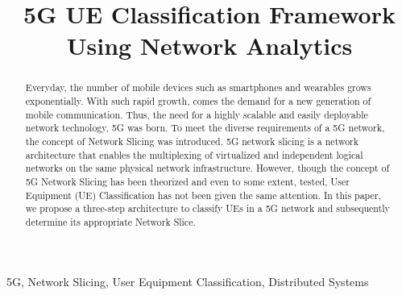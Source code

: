 \documentclass[conference]{IEEEtran}
\begin{document}
\title{5G UE Classification Framework Using Network Analytics\\
{\footnotesize \textsuperscript{}}
}

\author{
\and
{}
\and
{}
\and

}

\maketitle

\begin{abstract}
Everyday, the number of mobile devices such as smartphones and wearables grows exponentially. With such rapid growth, comes the demand for a new generation of mobile communication.
Thus, the need for a highly scalable and easily deployable network technology, 5G was born. To meet the diverse requirements of a 5G network, the concept of Network Slicing was introduced.
5G network slicing is a network architecture that enables the multiplexing of virtualized and independent logical networks on the same physical network infrastructure. However, though the concept of 5G Network Slicing has been theorized and even to some extent, tested, User Equipment (UE) Classification has not been given the same attention. In this paper, we propose a three-step architecture to classify UEs in a 5G network and subsequently determine its appropriate Network Slice.
\end{abstract}

\begin{IEEEkeywords}
5G, Network Slicing, User Equipment Classification, Distributed Systems
\end{IEEEkeywords}
\end{document}
